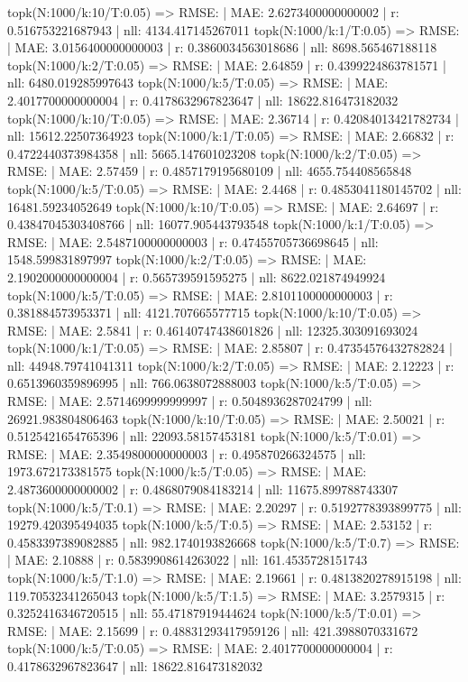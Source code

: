 topk(N:1000/k:10/T:0.05) => RMSE: | MAE: 2.6273400000000002 | r: 0.516753221687943 | nll: 4134.417145267011
topk(N:1000/k:1/T:0.05) => RMSE: | MAE: 3.0156400000000003 | r: 0.3860034563018686 | nll: 8698.565467188118
topk(N:1000/k:2/T:0.05) => RMSE: | MAE: 2.64859 | r: 0.4399224863781571 | nll: 6480.019285997643
topk(N:1000/k:5/T:0.05) => RMSE: | MAE: 2.4017700000000004 | r: 0.4178632967823647 | nll: 18622.816473182032
topk(N:1000/k:10/T:0.05) => RMSE: | MAE: 2.36714 | r: 0.42084013421782734 | nll: 15612.22507364923
topk(N:1000/k:1/T:0.05) => RMSE: | MAE: 2.66832 | r: 0.4722440373984358 | nll: 5665.147601023208
topk(N:1000/k:2/T:0.05) => RMSE: | MAE: 2.57459 | r: 0.4857179195680109 | nll: 4655.754408565848
topk(N:1000/k:5/T:0.05) => RMSE: | MAE: 2.4468 | r: 0.4853041180145702 | nll: 16481.59234052649
topk(N:1000/k:10/T:0.05) => RMSE: | MAE: 2.64697 | r: 0.43847045303408766 | nll: 16077.905443793548
topk(N:1000/k:1/T:0.05) => RMSE: | MAE: 2.5487100000000003 | r: 0.47455705736698645 | nll: 1548.599831897997
topk(N:1000/k:2/T:0.05) => RMSE: | MAE: 2.1902000000000004 | r: 0.565739591595275 | nll: 8622.021874949924
topk(N:1000/k:5/T:0.05) => RMSE: | MAE: 2.8101100000000003 | r: 0.381884573953371 | nll: 4121.707665577715
topk(N:1000/k:10/T:0.05) => RMSE: | MAE: 2.5841 | r: 0.46140747438601826 | nll: 12325.303091693024
topk(N:1000/k:1/T:0.05) => RMSE: | MAE: 2.85807 | r: 0.47354576432782824 | nll: 44948.79741041311
topk(N:1000/k:2/T:0.05) => RMSE: | MAE: 2.12223 | r: 0.6513960359896995 | nll: 766.0638072888003
topk(N:1000/k:5/T:0.05) => RMSE: | MAE: 2.5714699999999997 | r: 0.5048936287024799 | nll: 26921.983804806463
topk(N:1000/k:10/T:0.05) => RMSE: | MAE: 2.50021 | r: 0.5125421654765396 | nll: 22093.58157453181
topk(N:1000/k:5/T:0.01) => RMSE: | MAE: 2.3549800000000003 | r: 0.495870266324575 | nll: 1973.672173381575
topk(N:1000/k:5/T:0.05) => RMSE: | MAE: 2.4873600000000002 | r: 0.4868079084183214 | nll: 11675.899788743307
topk(N:1000/k:5/T:0.1) => RMSE: | MAE: 2.20297 | r: 0.5192778393899775 | nll: 19279.420395494035
topk(N:1000/k:5/T:0.5) => RMSE: | MAE: 2.53152 | r: 0.4583397389082885 | nll: 982.1740193826668
topk(N:1000/k:5/T:0.7) => RMSE: | MAE: 2.10888 | r: 0.5839908614263022 | nll: 161.4535728151743
topk(N:1000/k:5/T:1.0) => RMSE: | MAE: 2.19661 | r: 0.4813820278915198 | nll: 119.70532341265043
topk(N:1000/k:5/T:1.5) => RMSE: | MAE: 3.2579315 | r: 0.3252416346720515 | nll: 55.47187919444624
topk(N:1000/k:5/T:0.01) => RMSE: | MAE: 2.15699 | r: 0.48831293417959126 | nll: 421.3988070331672
topk(N:1000/k:5/T:0.05) => RMSE: | MAE: 2.4017700000000004 | r: 0.4178632967823647 | nll: 18622.816473182032
